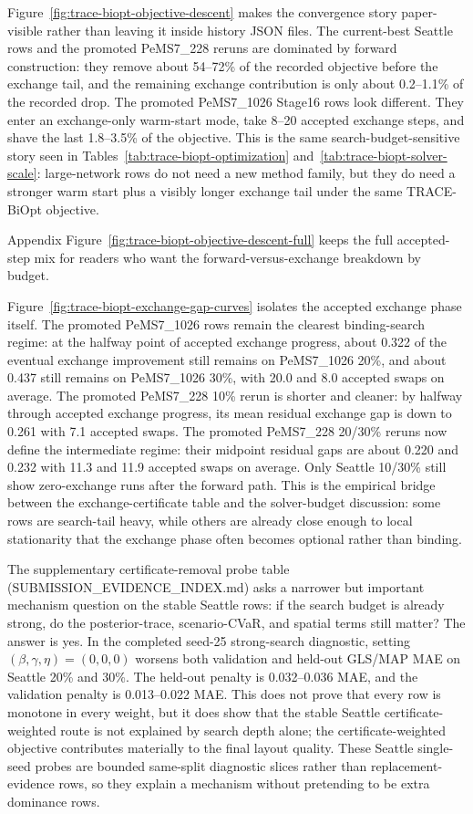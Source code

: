 Figure~\ref{fig:trace-biopt-objective-descent} makes the convergence story
paper-visible rather than leaving it inside history JSON files. The current-best
Seattle rows and the promoted PeMS7\_228 reruns are dominated by forward
construction: they remove about 54--72\% of the recorded objective before the
exchange tail, and the remaining exchange contribution is only about
0.2--1.1\% of the recorded drop. The promoted PeMS7\_1026 Stage16 rows look
different. They enter an exchange-only warm-start mode, take 8--20 accepted
exchange steps, and shave the last 1.8--3.5\% of the objective. This is the
same search-budget-sensitive story seen in Tables~\ref{tab:trace-biopt-optimization}
and~\ref{tab:trace-biopt-solver-scale}: large-network rows do not need a new
method family, but they do need a stronger warm start plus a visibly longer
exchange tail under the same TRACE-BiOpt objective.

Appendix Figure~\ref{fig:trace-biopt-objective-descent-full} keeps the full
accepted-step mix for readers who want the forward-versus-exchange breakdown by
budget.

Figure~\ref{fig:trace-biopt-exchange-gap-curves} isolates the accepted
exchange phase itself. The promoted PeMS7\_1026 rows remain the clearest
binding-search regime: at the halfway point of accepted exchange progress,
about 0.322 of the eventual exchange improvement still remains on
PeMS7\_1026 20\%, and about 0.437 still remains on PeMS7\_1026 30\%, with
20.0 and 8.0 accepted swaps on average. The promoted PeMS7\_228 10\% rerun is
shorter and cleaner: by halfway through accepted exchange progress, its mean
residual exchange gap is down to 0.261 with 7.1 accepted swaps. The promoted
PeMS7\_228 20/30\% reruns now define the intermediate regime: their midpoint
residual gaps are about 0.220 and 0.232 with 11.3 and 11.9 accepted swaps on
average. Only Seattle 10/30\% still show zero-exchange runs after the forward
path. This is the empirical bridge between the exchange-certificate table
and the solver-budget discussion: some rows are search-tail heavy, while
others are already close enough to local stationarity that the exchange phase
often becomes optional rather than binding.

The supplementary certificate-removal probe table
(SUBMISSION\_EVIDENCE\_INDEX.md) asks a narrower but important mechanism
question on the stable Seattle rows: if the search budget is already strong,
do the posterior-trace, scenario-CVaR, and spatial terms still matter? The
answer is yes. In the completed seed-25 strong-search diagnostic, setting
$(\beta,\gamma,\eta)=(0,0,0)$ worsens both validation and held-out GLS/MAP
MAE on Seattle 20\% and 30\%. The held-out penalty is 0.032--0.036 MAE, and
the validation penalty is 0.013--0.022 MAE. This does not prove that every row
is monotone in every weight, but it does show that the stable Seattle
certificate-weighted route is not explained by search depth alone; the
certificate-weighted objective contributes materially to the final layout
quality. These Seattle single-seed probes are bounded same-split diagnostic
slices rather than replacement-evidence rows, so they explain a mechanism
without pretending to be extra dominance rows.

